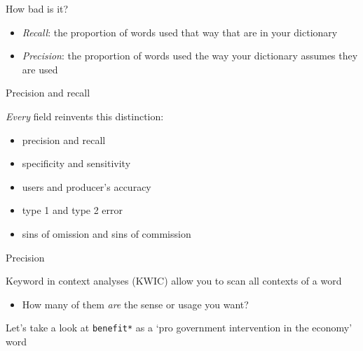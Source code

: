 \documentclass{hertieteaching}
\begin{document}
\begin{frame}{How bad is it?}

\begin{itemize}
  \item \textit{Recall}: the proportion of words used that way that are in your dictionary
  \item \textit{Precision}: the proportion of words used the way your dictionary
  assumes they are used
\end{itemize}

\end{frame}

\begin{frame}{Precision and recall}

\textit{Every} field reinvents this distinction:

\begin{itemize}
\item
  precision and recall
  \item
  specificity and sensitivity
  \item
  users and producer's accuracy
  \item
  type 1 and type 2 error
  \item sins of omission and sins of commission
\end{itemize}

\end{frame}

\begin{frame}{Precision}

Keyword in context analyses (KWIC) allow you to scan all contexts of a word 

\begin{itemize}
\item
  How many of them \textit{are} the sense or usage you want?
\end{itemize}

Let's take a look at \texttt{benefit*} as a `pro government intervention in the economy' word

\end{frame}
\end{document}
